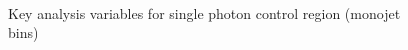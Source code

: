 \begin{figure}
\begin{center}
         \\
        \caption{Key analysis variables for single photon control region (monojet bins)}
        \label{fig:distribution_singlephoton_mono}
    \end{center}
\end{figure}

